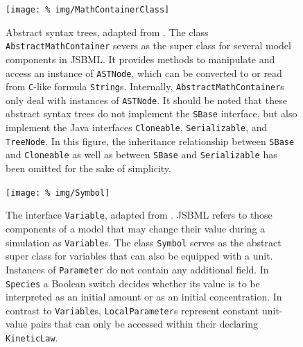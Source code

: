 \documentclass[
  BCOR12mm,
  letterpaper,
  11pt,
  headsepline,
  pointlessnumbers,
  tablecaptionabove,
  onelinecaption,
  headinclude,
  appendixprefix,
  idxtotoc,
  bibtotoc,
  twoside,
  titlepage
]{scrartcl}
\begin{document}
\begin{figure}[htb]
 \centering
 \texttt{[image: \%
img/MathContainerClass]}
 \caption[Abstract syntax trees]{Abstract syntax trees, adapted from
 \citep{Draeger2011}. The class \texttt{AbstractMathContainer} severs as the
 super class for several model components in JSBML. It provides methods to
 manipulate and access an instance  of \texttt{ASTNode}, which can be converted
 to or read from \texttt{C}-like formula \texttt{String}s. Internally,
 \texttt{AbstractMathContainer}s only deal with instances of \texttt{ASTNode}.
 It should be noted that these abstract syntax trees do not implement the
 \texttt{SBase} interface, but also implement the Java interfaces
 \texttt{Cloneable}, \texttt{Serializable}, and \texttt{TreeNode}. In this
 figure, the inheritance relationship between
 \texttt{SBase} and \texttt{Cloneable} as well as between \texttt{SBase} and
 \texttt{Serializable} has been omitted for the sake of simplicity.}
 \label{fig:MathContainer}
\end{figure}
\begin{figure}[p]
 \centering
 \texttt{[image: \%
img/Symbol]}
 \caption[The interface \texttt{Variable}]{The interface \texttt{Variable}, adapted from \citep{Draeger2011}. JSBML refers to those components of a model that may change their value during a simulation as \texttt{Variable}s. The class \texttt{Symbol} serves as the abstract super class for variables that can also be equipped with a unit. Instances of \texttt{Parameter} do not contain any additional field. In \texttt{Species} a Boolean switch decides whether its value is to be interpreted as an initial amount or as an initial concentration. In contrast to \texttt{Variable}s, \texttt{LocalParameter}s represent constant unit-value pairs that can only be accessed within their declaring \texttt{KineticLaw}.}
 \label{fig:Variable}
\end{figure}
\end{document}
